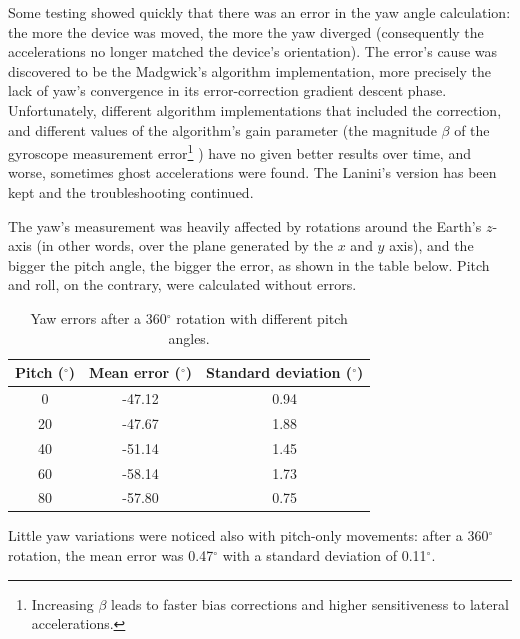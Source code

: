 Some testing showed quickly that there was an error in the yaw angle calculation: the more the device was moved, the more the yaw diverged (consequently the accelerations no longer matched the device's orientation). The error's cause was discovered to be the Madgwick's algorithm implementation, more precisely the lack of yaw's convergence in its error-correction gradient descent phase. Unfortunately, different algorithm implementations that included the correction, and different values of the algorithm's gain parameter (the magnitude $\beta$ of the gyroscope measurement error\footnote{Increasing $\beta$ leads to faster bias corrections and higher sensitiveness to lateral accelerations.} \cite[13]{Mad10}) have no given better results over time, and worse, sometimes ghost accelerations were found. The Lanini's version has been kept and the troubleshooting continued.
\bigbreak

The yaw's measurement was heavily affected by rotations around the Earth's $z$-axis (in other words, over the plane generated by the $x$ and $y$ axis), and the bigger the pitch angle, the bigger the error, as shown in the table below. Pitch and roll, on the contrary, were calculated without errors.
\bigbreak

\begin{table}[ht!]
	\centering
	\begin{tabular}{c|c c}
	\textbf{Pitch} ($^{\circ}$) & \textbf{Mean error} ($^{\circ}$) & \textbf{Standard deviation} ($^{\circ}$) \\ \hline
	0                           & -47.12                           & 0.94                                     \\
	20                          & -47.67                           & 1.88                                     \\
	40                          & -51.14                           & 1.45                                     \\
	60                          & -58.14                           & 1.73                                     \\
	80                          & -57.80                           & 0.75
	\end{tabular}
	\caption{Yaw errors after a 360$^{\circ}$ rotation with different pitch angles.}
\end{table}

Little yaw variations were noticed also with pitch-only movements: after a 360$^{\circ}$ rotation, the mean error was 0.47$^{\circ}$ with a standard deviation of 0.11$^{\circ}$.

